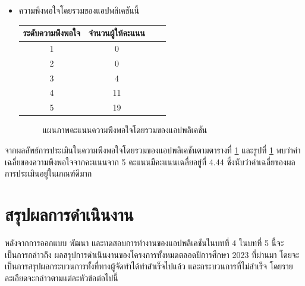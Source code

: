 \documentclass[14pt,oneside,openright,a4paper]{cpe-thai-project}
\begin{document}
\begin{itemize}
  \item ความพึงพอใจโดยรวมของแอปพลิเคชันนี้
  \begin{table}[!h]
    \centering
    \captionsetup{justification=centering} %
    \begin{tabular}{|c|c|c|c|}
      \hline
      \multicolumn{1}{|c|}{\cellcolor[HTML]{9FC5E8}ระดับความพึงพอใจ} &
        \multicolumn{1}{c|}{\cellcolor[HTML]{9FC5E8}จำนวนผู้ให้คะแนน} \\ \hline
       1 & 0
         \\ \hline 
       2 & 0
         \\ \hline 
       3 & 4
         \\ \hline 
       4 & 11
         \\ \hline 
       5 & 19
         \\ \hline
    \end{tabular}
    \label{tab:Featuresatisfaction}
  \end{table}
  \begin{figure}[!h]\centering
    \setlength{\fboxrule}{0.5mm} %
    \setlength{\fboxsep}{0.5cm}
    \caption{แผนภาพคะแนนความพึงพอใจโดยรวมของแอปพลิเคชัน}\label{fig:Featuresatisfaction}
  \end{figure}
\end{itemize}
จากผลลัพธ์การประเมินในความพึงพอใจโดยรวมของแอปพลิเคชันตามตารางที่ \ref{tab:Featuresatisfaction} และรูปที่ \ref{fig:Featuresatisfaction} พบว่าค่าเฉลี่ยของความพึงพอใจจากคะแนนจาก 5 คะแนนมีคะแนนเฉลี่ยอยู่ที่ 4.44 ซึ่งนับว่าค่าเฉลี่ยของผลการประเมินอยู่ในเกณฑ์ดีมาก

\newpage

\chapter{สรุปผลการดำเนินงาน}
หลังจากการออกแบบ พัฒนา และทดสอบการทํางานของแอปพลิเคชันในบทที่ 4 ในบทที่ 5 นี้จะเป็นการกล่าวถึง
ผลสรุปการดำเนินงานของโครงการทั้งหมดตลอดปีการศึกษา 2023 ที่ผ่านมา โดยจะเป็นการสรุปผลกระบวนการทั้งที่ทางผู้จัดทำได้ทำสำเร็จไปแล้ว 
และกระบวนการที่ไม่สำเร็จ โดยรายละเอียดจะกล่าวตามแต่ละหัวข้อต่อไปนี้
\end{document}
